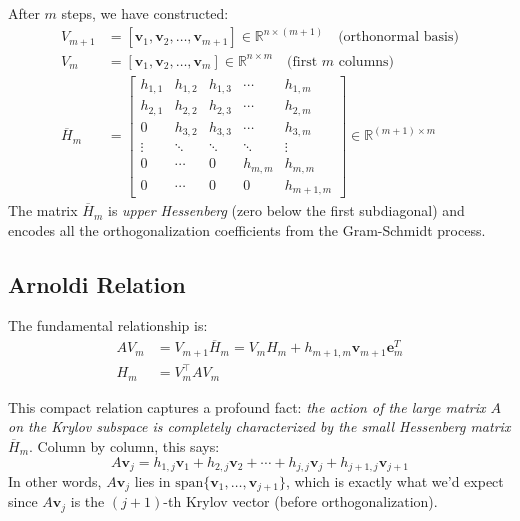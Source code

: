 After $m$ steps, we have constructed:
\begin{align}
  V_{m+1}        & = [\mathbf{v}_1, \mathbf{v}_2, \ldots, \mathbf{v}_{m+1}] \in \mathbb{R}^{n \times (m+1)} \quad \text{(orthonormal basis)} \\
  V_m            & = [\mathbf{v}_1, \mathbf{v}_2, \ldots, \mathbf{v}_m] \in \mathbb{R}^{n \times m} \quad \text{(first $m$ columns)}         \\
  \overline{H}_m & = \begin{bmatrix}
                       h_{1,1} & h_{1,2} & h_{1,3} & \cdots  & h_{1,m}   \\
                       h_{2,1} & h_{2,2} & h_{2,3} & \cdots  & h_{2,m}   \\
                       0       & h_{3,2} & h_{3,3} & \cdots  & h_{3,m}   \\
                       \vdots  & \ddots  & \ddots  & \ddots  & \vdots    \\
                       0       & \cdots  & 0       & h_{m,m} & h_{m,m}   \\
                       0       & \cdots  & 0       & 0       & h_{m+1,m}
                     \end{bmatrix} \in \mathbb{R}^{(m+1) \times m}
\end{align}
The matrix $\overline{H}_m$ is \emph{upper Hessenberg} (zero below the first subdiagonal) and encodes all the orthogonalization coefficients from the Gram-Schmidt process.

\subsection{Arnoldi Relation}
The fundamental relationship is:
\begin{align*}\label{eq:arnoldi-relation}
  AV_m & = V_{m+1}\overline{H}_m = V_m H_m + h_{m+1,m}\mathbf{v}_{m+1}\mathbf{e}_m^T \\
  H_m  & = V_m^\top A V_m
\end{align*}

This compact relation captures a profound fact: \emph{the action of the large matrix $A$ on the Krylov subspace is completely characterized by the small Hessenberg matrix $\overline{H}_m$}.
Column by column, this says:
\[
  A\mathbf{v}_j = h_{1,j}\mathbf{v}_1 + h_{2,j}\mathbf{v}_2 + \cdots + h_{j,j}\mathbf{v}_j + h_{j+1,j}\mathbf{v}_{j+1}
\]
In other words, $A\mathbf{v}_j$ lies in $\text{span}\{\mathbf{v}_1, \ldots, \mathbf{v}_{j+1}\}$, which is exactly what we'd expect since $A\mathbf{v}_j$ is the $(j+1)$-th Krylov vector (before orthogonalization).

